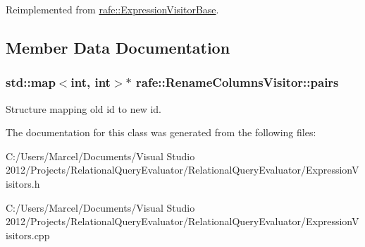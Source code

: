 Reimplemented from \hyperlink{classrafe_1_1_expression_visitor_base_a4eaa77bf4105d1cbdde4feb047228255}{rafe\+::\+Expression\+Visitor\+Base}.



\subsection{Member Data Documentation}
\hypertarget{classrafe_1_1_rename_columns_visitor_a39a19156a5b795544046cf3c933b1148}{
\subsubsection[{pairs}]{\setlength{\rightskip}{0pt plus 5cm}std\+::map$<$int, int$>$$\ast$ rafe\+::\+Rename\+Columns\+Visitor\+::pairs}}\label{classrafe_1_1_rename_columns_visitor_a39a19156a5b795544046cf3c933b1148}
Structure mapping old id to new id. 

The documentation for this class was generated from the following files\+:\begin{DoxyCompactItemize}
\item 
C\+:/\+Users/\+Marcel/\+Documents/\+Visual Studio 2012/\+Projects/\+Relational\+Query\+Evaluator/\+Relational\+Query\+Evaluator/Expression\+Visitors.\+h\item 
C\+:/\+Users/\+Marcel/\+Documents/\+Visual Studio 2012/\+Projects/\+Relational\+Query\+Evaluator/\+Relational\+Query\+Evaluator/Expression\+Visitors.\+cpp\end{DoxyCompactItemize}
